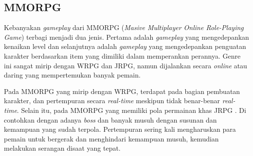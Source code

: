 \begin{subs}
	\subsection{MMORPG}
	\label{sec:sub_sec2_mmorpg}
	
	Kebanyakan \textit{gameplay} dari MMORPG (\textit{Masive Multiplayer Online Role-Playing Game}) terbagi menjadi dua jenis. Pertama adalah \textit{gameplay} yang mengedepankan kenaikan level dan selanjutnya adalah \textit{gameplay} yang mengedepankan penguatan karakter berdasarkan item yang dimiliki dalam memperankan perannya. Genre ini sangat mirip dengan WRPG dan JRPG, namun dijalankan secara \textit{online} atau daring yang mempertemukan banyak pemain.
	\vspace{1ex}
	
	Pada MMORPG yang mirip dengan WRPG, terdapat pada bagian pembuatan karakter, dan pertempuran secara \textit{real-time} meskipun tidak benar-benar \textit{real-time}. Selain itu, pada MMORPG yang memiliki pola permainan khas JRPG \citep{moore2016}. Di contohkan dengan adanya \textit{boss} dan banyak musuh dengan susunan dan kemampuan yang sudah terpola. Pertempuran sering kali mengharuskan para pemain untuk bergerak dan menghindari kemampuan musuh, kemudian melakukan serangan disaat yang tepat.
	
\end{subs}